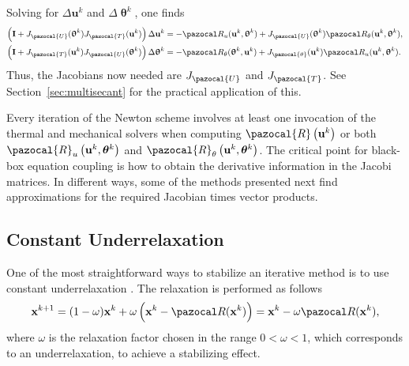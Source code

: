 Solving for \(\Delta \mathbf u^k\) and \(\Delta \bm \uptheta^k\), one finds
\begin{align}
  \left(\mathbf I + J_\pazocal{U}(\bm\uptheta^k)J_\pazocal{T}(\mathbf u^k)\right)\Delta \mathbf u^k &= - \pazocal R_u(\mathbf u^k, \bm \uptheta^k)+J_\pazocal{U}(\bm\uptheta^k)\pazocal R_\theta(\mathbf u^k, \bm\uptheta^k), \label{eq:explicit_eq_delta_u_newton}\\
  \left(\mathbf I + J_\pazocal{T}(\mathbf u^k)J_\pazocal{U}(\bm\uptheta^k)\right)\Delta \bm\uptheta^k &= - \pazocal R_\theta(\bm \uptheta^k, \mathbf u^k)+J_\pazocal{\theta}(\mathbf u^k)\pazocal R_u(\mathbf u^k, \bm\uptheta^k). \label{eq:explicit_eq_delta_theta_newton}
\end{align}
Thus, the Jacobians now needed are \(J_\pazocal{U}\) and \(J_\pazocal{T}\).
See Section~\ref{sec:multisecant} for the practical application of this.

Every iteration of the Newton scheme involves at least one invocation of the thermal and mechanical solvers when computing $\pazocal{R}\left(\mathbf{u}^{k}\right)$ or both $\pazocal{R}_{u}\left(\mathbf{u}^{k}, \boldsymbol{\theta}^{k}\right)$ and $\pazocal{R}_{\theta}\left(\mathbf{u}^{k}, \boldsymbol{\theta}^{k}\right)$.
The critical point for black-box equation coupling is how to obtain the derivative information in the Jacobi matrices.
In different ways, some of the methods presented next find approximations for the required Jacobian times vector products.



\subsection{Constant Underrelaxation} \label{sec:underrelaxation}

One of the most straightforward ways to stabilize an iterative method is to use constant underrelaxation \citep{gatzhammer_efficient_2014}.
The relaxation is performed as follows
\begin{equation} \label{eq:constant_relaxation}
\mathbf x^{k+1}=(1-\omega) \mathbf x^{k}+\omega\left(\mathbf x^k - \pazocal R(\mathbf x^k)\right)=\mathbf x^{k} -\omega \pazocal R(\mathbf x^k),
\end{equation}
where \(\omega\) is the relaxation factor chosen in the range \(0<\omega<1\), which corresponds to an underrelaxation, to achieve a stabilizing effect.

